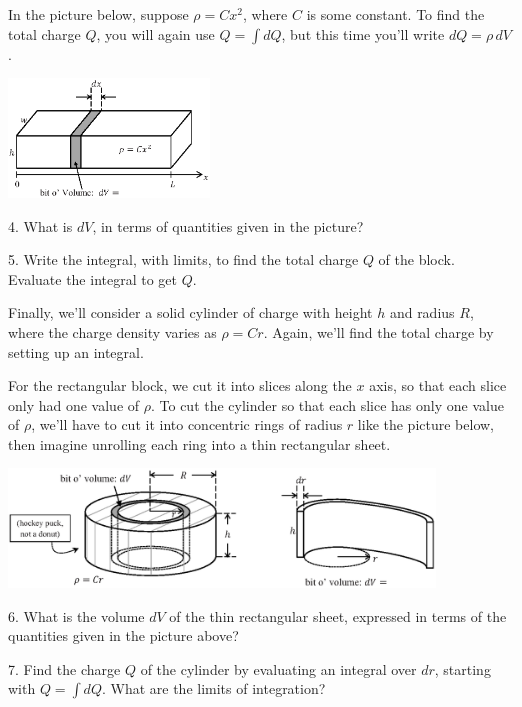 \newpage

In the picture below, suppose $\rho = Cx^2$, where $C$ is some constant. To find the total charge $Q$, you will again use $Q = \int dQ$, but this time you'll write $dQ = \rho \,dV$.  
\vspace{-0.2 in}
\begin{center}
\includegraphics[width=0.40\textwidth]{charge_density/fig4.eps}
\end{center}

4.  What is $dV$, in terms of quantities given in the picture?
\vspace{0.3in}

5.  Write the integral, with limits, to find the total charge $Q$ of the block.  Evaluate the integral to get $Q$.
\vspace{1.0in}

Finally, we'll consider a solid cylinder of charge with height $h$ and radius $R$, where the charge density varies as $\rho = Cr$.  Again, we'll find the total charge by setting up an integral. 

For the rectangular block, we cut it into slices along the $x$ axis, so that each slice only had one value of $\rho$.  To cut the cylinder so that each slice has only one value of $\rho$, we'll have to cut it into concentric rings of radius $r$ like the picture below, then imagine unrolling each ring into a thin rectangular sheet.

\begin{center}
\includegraphics[width=0.85\textwidth]{charge_density/cylinders.eps}
\end{center}

6. What is the volume $dV$ of the thin rectangular sheet, expressed in terms of the quantities given in the picture above?
\vspace{0.3in}

7. Find the charge $Q$ of the cylinder by evaluating an integral over $dr$, starting with $Q = \int dQ$.  What are the limits of integration? 




